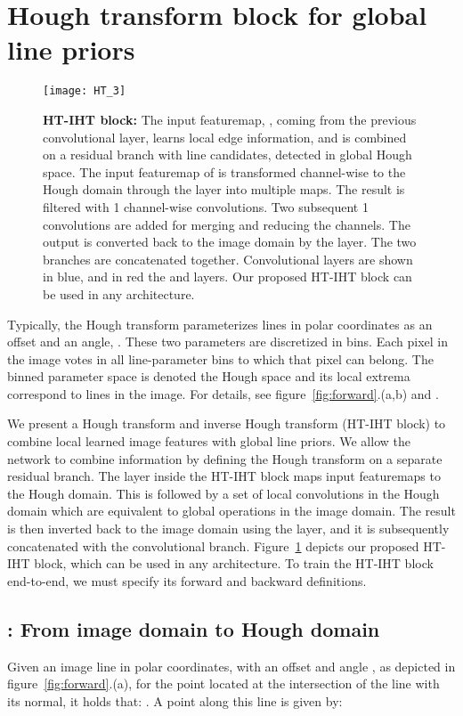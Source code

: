 \documentclass[runningheads]{llncs}
\newcommand{\model}{HT-IHT block\xspace}
\begin{document}
 \section{Hough transform block for global line priors}
\begin{figure}[t!]
    \centering
    \texttt{[image: HT\_3]}
    \caption{\textbf{\model:} The input featuremap, , coming from the previous convolutional layer, learns local edge information, and is combined on a residual branch with line candidates, detected in global Hough space.
    The input featuremap of  is transformed channel-wise to the Hough domain through the  layer into multiple  maps. 
    The result is filtered with 1 channel-wise convolutions.
    Two subsequent 1 convolutions are added for merging and reducing the channels.  
    The output is converted back to the image domain by the  layer.
    The two branches are concatenated together.
    Convolutional layers are shown in blue, and in red the  and  layers.
    Our proposed \model can be used in any architecture.}
    \label{fig:block}
\end{figure}

Typically, the Hough transform parameterizes lines in polar coordinates as an offset  and an angle, . These two parameters are discretized in bins. Each pixel in the image votes in all line-parameter bins to which that pixel can belong. 
The binned parameter space is denoted the Hough space and its local extrema correspond to lines in the image. For details, see  figure~\ref{fig:forward}.(a,b) and \cite{duda1972use}.     

We present a Hough transform and inverse Hough transform  (\model) to combine local learned image features  with  global line priors.
We allow the network to combine information by defining the 
Hough transform on a separate residual branch. The  layer inside the \model maps input featuremaps to the Hough domain.  
This is followed by a set of local convolutions in the Hough domain which are equivalent to global operations in the image domain. 
The result is then inverted back to the image domain using the  layer, and it is subsequently concatenated with the convolutional branch.
Figure~\ref{fig:block} depicts our proposed \model, which can be used in any architecture.  
To train the \model end-to-end, we must specify its forward and backward definitions. 

\subsection{: From image domain to Hough domain}
Given an image line  in polar coordinates, with an offset  and angle , as depicted in figure~\ref{fig:forward}.(a), 
for the point  located at the intersection of the line with its normal, it holds that: . A  point along this line  is given by:
\end{document}

